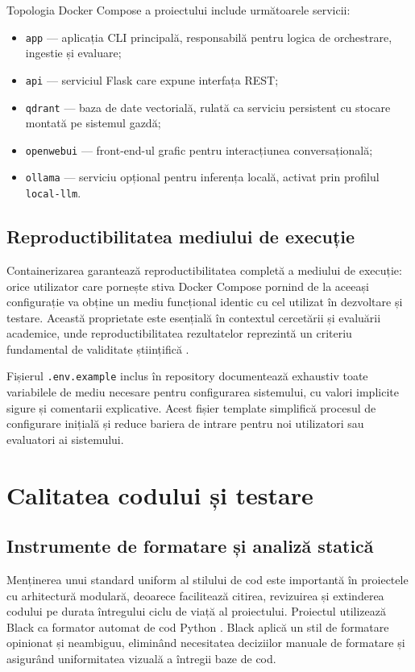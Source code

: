 \documentclass[12pt, a4paper, oneside, romanian]{teza-upb}
\begin{document}
Topologia Docker Compose a proiectului include următoarele servicii:
\begin{itemize}
  \item \texttt{app} — aplicația CLI principală, responsabilă pentru 
  logica de orchestrare, ingestie și evaluare;
  \item \texttt{api} — serviciul Flask care expune interfața REST;
  \item \texttt{qdrant} — baza de date vectorială, rulată ca serviciu 
  persistent cu stocare montată pe sistemul gazdă;
  \item \texttt{openwebui} — front-end-ul grafic pentru interacțiunea 
  conversațională;
  \item \texttt{ollama} — serviciu opțional pentru inferența locală, 
  activat prin profilul \texttt{local-llm}.
\end{itemize}

\subsection{Reproductibilitatea mediului de execuție}

Containerizarea garantează reproductibilitatea completă a mediului de execuție: orice utilizator care pornește stiva Docker Compose pornind de la aceeași configurație va obține un mediu funcțional identic cu cel utilizat în dezvoltare și testare. Această proprietate este esențială în contextul cercetării și evaluării academice, unde reproductibilitatea rezultatelor reprezintă un criteriu fundamental de validitate științifică \cite{reproducibility2018}.

Fișierul \texttt{.env.example} inclus în repository documentează exhaustiv toate variabilele de mediu necesare pentru configurarea sistemului, cu valori implicite sigure și comentarii explicative. Acest fișier template simplifică procesul de configurare inițială și reduce bariera de intrare pentru noi utilizatori sau evaluatori ai sistemului.

\section{Calitatea codului și testare}

\subsection{Instrumente de formatare și analiză statică}

Menținerea unui standard uniform al stilului de cod este importantă în proiectele cu arhitectură modulară, deoarece facilitează citirea, revizuirea și extinderea codului pe durata întregului ciclu de viață al proiectului. Proiectul utilizează Black ca formator automat de cod Python \cite{black_doc}. Black aplică un stil de formatare opinionat și neambiguu, eliminând necesitatea deciziilor manuale de formatare și asigurând uniformitatea vizuală a întregii baze de cod.
\end{document}
